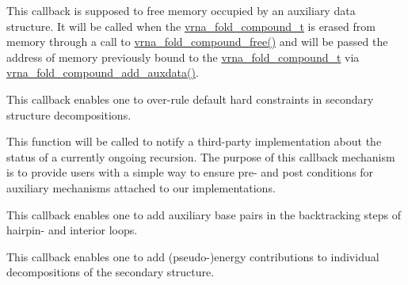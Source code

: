 \begin{DoxyRefList}
\item[\label{callbacks__callbacks000005}%
\Hypertarget{callbacks__callbacks000005}%
Global \mbox{\hyperlink{group__fold__compound_ga7806651f51b195013839a218b3bbd5a3}{vrna\+\_\+callback\+\_\+free\+\_\+auxdata}} (void $\ast$data)]This callback is supposed to free memory occupied by an auxiliary data structure. It will be called when the \mbox{\hyperlink{group__fold__compound_ga1b0cef17fd40466cef5968eaeeff6166}{vrna\+\_\+fold\+\_\+compound\+\_\+t}} is erased from memory through a call to \mbox{\hyperlink{group__fold__compound_gadded6039d63f5d6509836e20321534ad}{vrna\+\_\+fold\+\_\+compound\+\_\+free()}} and will be passed the address of memory previously bound to the \mbox{\hyperlink{group__fold__compound_ga1b0cef17fd40466cef5968eaeeff6166}{vrna\+\_\+fold\+\_\+compound\+\_\+t}} via \mbox{\hyperlink{group__fold__compound_ga6316a9426bea2f742375e8df6febd3f6}{vrna\+\_\+fold\+\_\+compound\+\_\+add\+\_\+auxdata()}}.  
\item[\label{callbacks__callbacks000001}%
\Hypertarget{callbacks__callbacks000001}%
Global \mbox{\hyperlink{group__hard__constraints_gae465f1d4a3d8b6592b38ecbb0d9f613d}{vrna\+\_\+callback\+\_\+hc\+\_\+evaluate}} (int i, int j, int k, int l, unsigned char d, void $\ast$data)]This callback enables one to over-\/rule default hard constraints in secondary structure decompositions.  
\item[\label{callbacks__callbacks000006}%
\Hypertarget{callbacks__callbacks000006}%
Global \mbox{\hyperlink{group__fold__compound_gac86036fa8cad1108832335063243cdc8}{vrna\+\_\+callback\+\_\+recursion\+\_\+status}} (unsigned char status, void $\ast$data)]This function will be called to notify a third-\/party implementation about the status of a currently ongoing recursion. The purpose of this callback mechanism is to provide users with a simple way to ensure pre-\/ and post conditions for auxiliary mechanisms attached to our implementations.  
\item[\label{callbacks__callbacks000004}%
\Hypertarget{callbacks__callbacks000004}%
Global \mbox{\hyperlink{group__soft__constraints_gaeb6448da6c593d4c489c7fbadcb99499}{vrna\+\_\+callback\+\_\+sc\+\_\+backtrack}} (int i, int j, int k, int l, unsigned char d, void $\ast$data)]This callback enables one to add auxiliary base pairs in the backtracking steps of hairpin-\/ and interior loops.  
\item[\label{callbacks__callbacks000002}%
\Hypertarget{callbacks__callbacks000002}%
Global \mbox{\hyperlink{group__soft__constraints_ga88a266695d9e25cc12114dceb7b4565e}{vrna\+\_\+callback\+\_\+sc\+\_\+energy}} (int i, int j, int k, int l, unsigned char d, void $\ast$data)]This callback enables one to add (pseudo-\/)energy contributions to individual decompositions of the secondary structure.  

\end{DoxyRefList}
